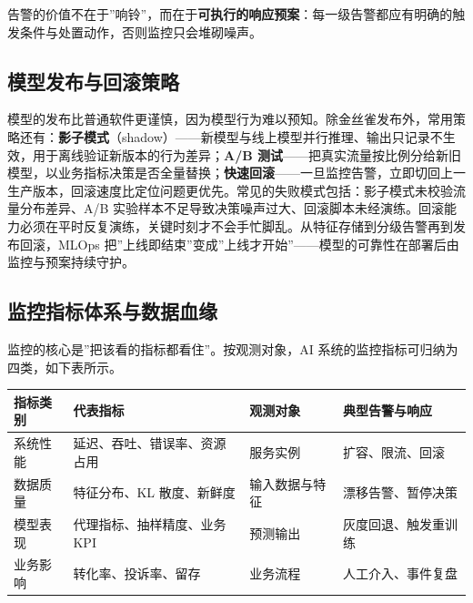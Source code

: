 \documentclass[
]{ctexbook}
\newcounter{none}
\begin{document}
告警的价值不在于''响铃''，而在于\textbf{可执行的响应预案}：每一级告警都应有明确的触发条件与处置动作，否则监控只会堆砌噪声。

\subsection{模型发布与回滚策略}\label{ux6a21ux578bux53d1ux5e03ux4e0eux56deux6edaux7b56ux7565}

模型的发布比普通软件更谨慎，因为模型行为难以预知。除金丝雀发布外，常用策略还有：\textbf{影子模式}（shadow）------新模型与线上模型并行推理、输出只记录不生效，用于离线验证新版本的行为差异；\textbf{A/B
测试}------把真实流量按比例分给新旧模型，以业务指标决策是否全量替换；\textbf{快速回滚}------一旦监控告警，立即切回上一生产版本，回滚速度比定位问题更优先。常见的失败模式包括：影子模式未校验流量分布差异、A/B
实验样本不足导致决策噪声过大、回滚脚本未经演练。回滚能力必须在平时反复演练，关键时刻才不会手忙脚乱。从特征存储到分级告警再到发布回滚，MLOps
把''上线即结束''变成''上线才开始''------模型的可靠性在部署后由监控与预案持续守护。

\subsection{监控指标体系与数据血缘}\label{ux76d1ux63a7ux6307ux6807ux4f53ux7cfbux4e0eux6570ux636eux8840ux7f18}

监控的核心是''把该看的指标都看住''。按观测对象，AI
系统的监控指标可归纳为四类，如下表所示。

{\def\LTcaptype{none} %
\begin{longtable}[]{@{}
  >{\raggedright\arraybackslash}p{}
  >{\raggedright\arraybackslash}p{}
  >{\raggedright\arraybackslash}p{}
  >{\raggedright\arraybackslash}p{}@{}}
\toprule\noalign{}
\begin{minipage}[b]{\linewidth}\raggedright
指标类别
\end{minipage} & \begin{minipage}[b]{\linewidth}\raggedright
代表指标
\end{minipage} & \begin{minipage}[b]{\linewidth}\raggedright
观测对象
\end{minipage} & \begin{minipage}[b]{\linewidth}\raggedright
典型告警与响应
\end{minipage} \\
\midrule\noalign{}
\endhead
\bottomrule\noalign{}
\endlastfoot
系统性能 & 延迟、吞吐、错误率、资源占用 & 服务实例 & 扩容、限流、回滚 \\
数据质量 & 特征分布、KL 散度、新鲜度 & 输入数据与特征 &
漂移告警、暂停决策 \\
模型表现 & 代理指标、抽样精度、业务 KPI & 预测输出 &
灰度回退、触发重训练 \\
业务影响 & 转化率、投诉率、留存 & 业务流程 & 人工介入、事件复盘 \\
\end{longtable}
}
\end{document}
